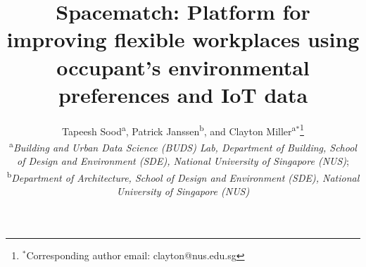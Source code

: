 \documentclass[]{interact}
\theoremstyle{plain}%
\theoremstyle{definition}
\theoremstyle{remark}
\begin{document}

\title{Spacematch: Platform for improving flexible workplaces using occupant's environmental preferences and IoT data}

\author{Tapeesh Sood\textsuperscript{a},
Patrick Janssen\textsuperscript{b},
and Clayton Miller\textsuperscript{a}$^{\ast}$\thanks{$^\ast$Corresponding author email: clayton@nus.edu.sg}\\
\vspace{6pt}
\textsuperscript{a}{\em Building and Urban Data Science (BUDS) Lab, Department of Building, School of Design and Environment (SDE), National University of Singapore (NUS)};\\
\textsuperscript{b}{\em Department of Architecture, School of Design and Environment (SDE), National University of Singapore (NUS)}
}

\maketitle
\end{document}
